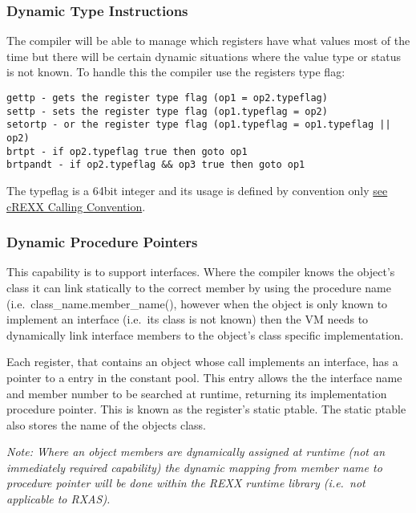 \hypertarget{dynamic-type-instructions}{%
\subsubsection{Dynamic Type
Instructions}\label{dynamic-type-instructions}}

The compiler will be able to manage which registers have what values
most of the time but there will be certain dynamic situations where the
value type or status is not known. To handle this the compiler use the
registers type flag:

\begin{verbatim}
gettp - gets the register type flag (op1 = op2.typeflag)
settp - sets the register type flag (op1.typeflag = op2)
setortp - or the register type flag (op1.typeflag = op1.typeflag || op2)
brtpt - if op2.typeflag true then goto op1
brtpandt - if op2.typeflag && op3 true then goto op1
\end{verbatim}

The typeflag is a 64bit integer and its usage is defined by convention
only \protect\hyperlink{crexx-calling-convention}{see cREXX Calling
Convention}.

\hypertarget{dynamic-procedure-pointers}{%
\subsubsection{Dynamic Procedure
Pointers}\label{dynamic-procedure-pointers}}

This capability is to support interfaces. Where the compiler knows the
object's class it can link statically to the correct member by using the
procedure name (i.e.~class\_name.member\_name(), however when the object
is only known to implement an interface (i.e.~its class is not known)
then the VM needs to dynamically link interface members to the object's
class specific implementation.

Each register, that contains an object whose call implements an
interface, has a pointer to a entry in the constant pool. This entry
allows the the interface name and member number to be searched at
runtime, returning its implementation procedure pointer. This is known
as the register's static ptable. The static ptable also stores the name
of the objects class.

\emph{Note: Where an object members are dynamically assigned at runtime
(not an immediately required capability) the dynamic mapping from member
name to procedure pointer will be done within the REXX runtime library
(i.e.~not applicable to RXAS).}

